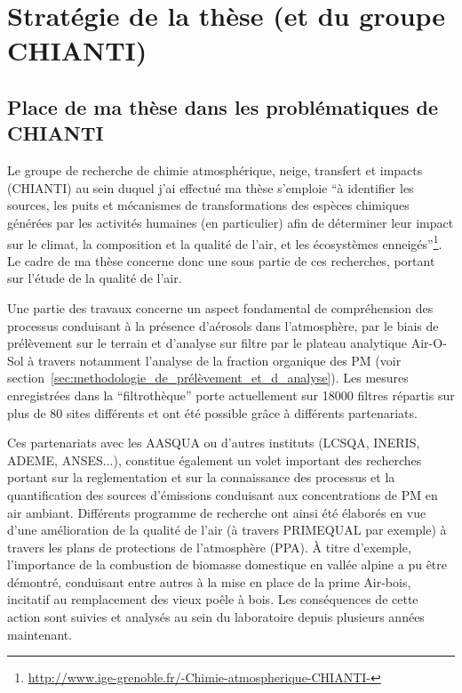 
\section{Stratégie de la thèse (et du groupe CHIANTI)}%
\label{sec:stratégie__du_groupe_chianti}

\subsection{Place de ma thèse dans les problématiques de CHIANTI}%
\label{sub:place_de_ma_thèse_dans_les_problématiques_de_chianti}

Le groupe de recherche de chimie atmosphérique, neige, transfert et impacts (CHIANTI) au
sein duquel j'ai effectué ma thèse s'emploie ``à identifier les sources, les puits et
mécanismes de transformations des espèces chimiques générées par les activités humaines
(en particulier) afin de déterminer leur impact sur le climat, la composition et la
qualité de l’air, et les écosystèmes
enneigés''\footnote{\url{http://www.ige-grenoble.fr/-Chimie-atmospherique-CHIANTI-}}.
Le cadre de ma thèse concerne donc une sous partie de ces recherches, portant sur l'étude
de la qualité de l'air.

Une partie des travaux concerne un aspect fondamental de compréhension des processus
conduisant à la présence d'aérosols dans l'atmosphère, par le biais de prélèvement sur le
terrain et d'analyse sur filtre par le plateau analytique Air-O-Sol à travers notamment
l'analyse de la fraction organique des PM (voir
section~\ref{sec:methodologie_de_prélèvement_et_d_analyse}).
Les mesures enregistrées dans la ``filtrothèque'' porte actuellement sur \num{18000}
filtres répartis sur plus de 80 sites différents et ont été possible grâce à différents
partenariats.

Ces partenariats avec les AASQUA ou d'autres instituts (LCSQA, INERIS, ADEME, ANSES...),
constitue également un volet important des recherches portant sur la reglementation et sur
la connaissance des processus et la quantification des sources d'émissions conduisant aux
concentrations de PM en air ambiant.
Différents programme de recherche ont ainsi été élaborés en vue d'une amélioration de la
qualité de l'air (à travers PRIMEQUAL par exemple) à travers les plans de protections de
l'atmosphère (PPA). À titre d'exemple, l'importance
de la combustion de biomasse domestique en vallée alpine a pu être démontré, conduisant
entre autres à la mise en place de la prime Air-bois, incitatif au remplacement des vieux
poêle à bois. Les conséquences de cette action sont suivies et
analysés au sein du laboratoire depuis plusieurs années maintenant.

